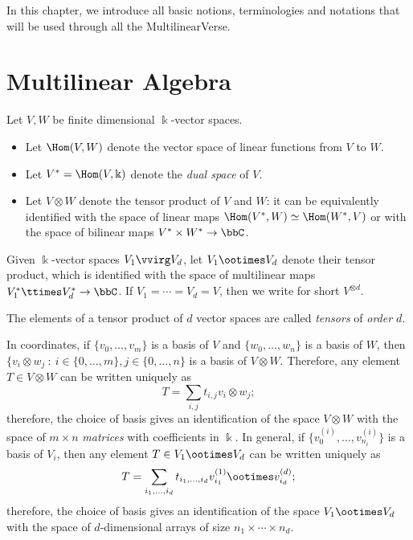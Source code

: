 In this chapter, we introduce all basic notions, terminologies and notations that will be used through all the MultilinearVerse. 

\section{Multilinear Algebra}
\label{introduction-section-representingtensors}

\begin{definition}
\label{introduction-definition-tensor_product}
Let $V,W$ be finite dimensional $\Bbbk$-vector spaces. 
\begin{itemize}
    \item Let $\Hom(V,W)$ denote the vector space of linear functions from $V$ to $W$.
    \item Let $V^* = \Hom(V,\Bbbk)$ denote the \emph{dual space} of $V$.
    \item Let $V \otimes W$ denote the tensor product of $V$ and $W$: it can be equivalently identified with the space of linear maps $\Hom(V^*,W) \simeq \Hom(W^*,V)$ or with the space of bilinear maps $V^* \times W^* \to \bbC$.
\end{itemize}
Given $\Bbbk$-vector spaces $V_1 \vvirg V_d$, let $V_1 \ootimes V_d$ denote their tensor product, which is identified with the space of multilinear maps $V_1^* \ttimes V_d^* \to \bbC$. If $V_1 = \cdots = V_d = V$, then we write for short $V^{\otimes d}$. 

The elements of a tensor product of $d$ vector spaces are called \emph{tensors} of \emph{order $d$}.

In coordinates, if $\{v_0,\ldots,v_m\}$ is a basis of $V$ and $\{w_0,\ldots,w_n\}$ is a basis of $W$, then $\{v_i \otimes w_j ~:~ i \in \{0,\ldots,m\}, j \in \{0,\ldots,n\}$ is a basis of $V\otimes W$. Therefore, any element $T \in V\otimes W$ can be written uniquely as 
\[
    T = \sum_{i,j} t_{i,j}v_i\otimes w_j;
\]
therefore, the choice of basis gives an identification of the space $V\otimes W$ with the space of $m\times n$ \emph{matrices} with coefficients in $\Bbbk$. In general, if $\{v_0^{(i)},\ldots,v_{n_i}^{(i)}\}$ is a basis of $V_i$, then any element $T \in V_1 \ootimes V_d$ can be written uniquely as 
\[
    T = \sum_{i_1,\ldots,i_d} t_{i_1,\ldots,i_d}v_{i_1}^{(1)}\ootimes v_{i_d}^{(d)};
\]
therefore, the choice of basis gives an identification of the space $V_1 \ootimes V_d$ with the space of $d$-dimensional arrays of size $n_1 \times\cdots\times n_d$. 
\end{definition}

